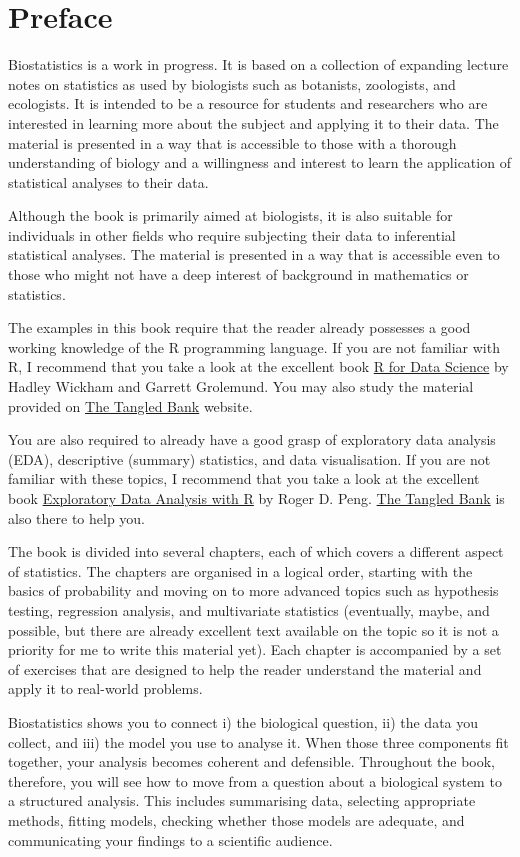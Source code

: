 \cleardoublepage
\chapter*{Preface}
Biostatistics is a work in progress. It is based on a collection of expanding lecture notes on statistics as used by biologists such as botanists, zoologists, and ecologists. It is intended to be a resource for students and researchers who are interested in learning more about the subject and applying it to their data. The material is presented in a way that is accessible to those with a thorough understanding of biology and a willingness and interest to learn the application of statistical analyses to their data.

Although the book is primarily aimed at biologists, it is also suitable for individuals in other fields who require subjecting their data to inferential statistical analyses. The material is presented in a way that is accessible even to those who might not have a deep interest of background in mathematics or statistics.

The examples in this book require that the reader already possesses a good working knowledge of the R programming language. If you are not familiar with R, I recommend that you take a look at the excellent book \href{https://r4ds.had.co.nz/}{R for Data Science} by Hadley Wickham and Garrett Grolemund. You may also study the material provided on \href{https://tangledbank.netlify.app}{The Tangled Bank} website.

You are also required to already have a good grasp of exploratory data analysis (EDA), descriptive (summary) statistics, and data visualisation. If you are not familiar with these topics, I recommend that you take a look at the excellent book \href{https://bookdown.org/rdpeng/exdata/}{Exploratory Data Analysis with R} by Roger D. Peng. \href{https://tangledbank.netlify.app}{The Tangled Bank} is also there to help you.

The book is divided into several chapters, each of which covers a different aspect of statistics. The chapters are organised in a logical order, starting with the basics of probability and moving on to more advanced topics such as hypothesis testing, regression analysis, and multivariate statistics (eventually, maybe, and possible, but there are already excellent text available on the topic so it is not a priority for me to write this material yet). Each chapter is accompanied by a set of exercises that are designed to help the reader understand the material and apply it to real-world problems.

Biostatistics shows you to connect i) the biological question, ii) the data you collect, and iii) the model you use to analyse it. When those three components fit together, your analysis becomes coherent and defensible. Throughout the book, therefore, you will see how to move from a question about a biological system to a structured analysis. This includes summarising data, selecting appropriate methods, fitting models, checking whether those models are adequate, and communicating your findings to a scientific audience.